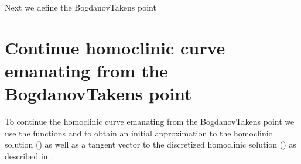 \documentclass[letterpaper,10pt,english]{jupyterBook}
\begin{document}
\sphinxAtStartPar
Next we define the Bogdanov\sphinxhyphen{}Takens point

\begin{sphinxVerbatim}[commandchars=\\\{\}]
\PYG{p}{[}\PYG{p}{]}
\PYG{p}{[}\PYG{p}{]}
\end{sphinxVerbatim}


\section{Continue homoclinic curve emanating from the Bogdanov\sphinxhyphen{}Takens point}
\label{\detokenize{HodgkinHuxley:continue-homoclinic-curve-emanating-from-the-bogdanov-takens-point}}
\sphinxAtStartPar
To continue the homoclinic curve emanating from the Bogdanov\sphinxhyphen{}Takens point we
use the functions  and  to obtain an initial
approximation to the homoclinic solution () as well as a tangent vector
to the discretized homoclinic solution () as described in
{\hyperref[\detokenize{Morris-Lecar:initial-prediction-homoclinic-orbit}]{}}.
\end{document}
